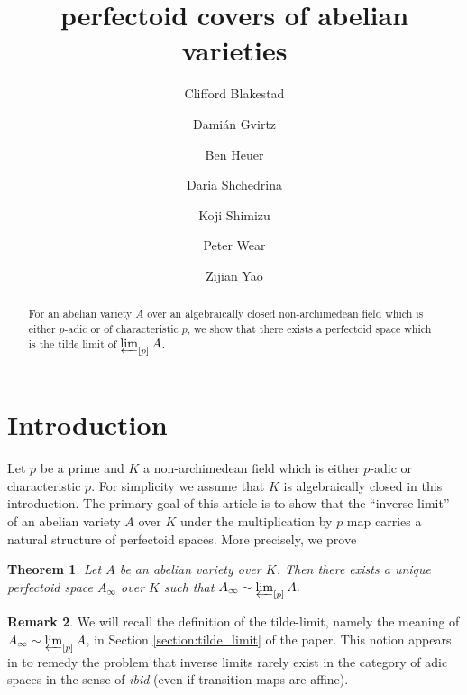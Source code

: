 \documentclass[10pt,oneside]{amsart}
\title[perfectoid covers of abelian varieties]{perfectoid  covers of abelian varieties}
\author{
	Clifford Blakestad \and
	Dami\'an Gvirtz \and
	Ben Heuer \and 
	Daria Shchedrina \and
	Koji Shimizu \and 
	Peter Wear \and
	Zijian Yao}
\newtheorem{mainthm}{Theorem}
\theoremstyle{definition}
\newtheorem{remark*}[mainthm]{Remark}
\begin{document}
	
	\maketitle
	
	\begin{abstract}
For an abelian variety $A$ over an algebraically closed non-archimedean field which is either $p$-adic or of characteristic $p$, we show that there exists a perfectoid space which is the tilde limit of $\varprojlim_{[p]}A$.
	\end{abstract}
	

	
	
 	
	

	\section{Introduction} 

Let $p$ be a prime and $K$ a non-archimedean field which is either $p$-adic or characteristic $p$. For simplicity we assume that $K$ is  algebraically closed in this introduction. The primary goal of this article is to show that the ``inverse limit'' of an abelian variety $A$ over $K$ under the multiplication by $p$ map carries a natural structure of perfectoid spaces. %
More precisely, we prove 

         \begin{mainthm} \label{thm:main_thm_intro}
		Let $A$ be an abelian variety over $K$. Then there exists a unique perfectoid space $A_\infty$ over $K$ such that
				$A_\infty \sim \varprojlim_{[p]} A.$
	\end{mainthm}
	
\begin{remark*}	 \label{remark:inverse_limit_adic}
We will recall the definition of the tilde-limit, namely the meaning of $A_\infty \sim \varprojlim_{[p]} A$, in Section \ref{section:tilde_limit} of the paper. This notion appears in \cite{SW} to remedy the problem that inverse limits rarely exist in the category of adic spaces in the sense of \textit{\small ibid} (even if transition maps are affine). 
\end{remark*}
\end{document}
